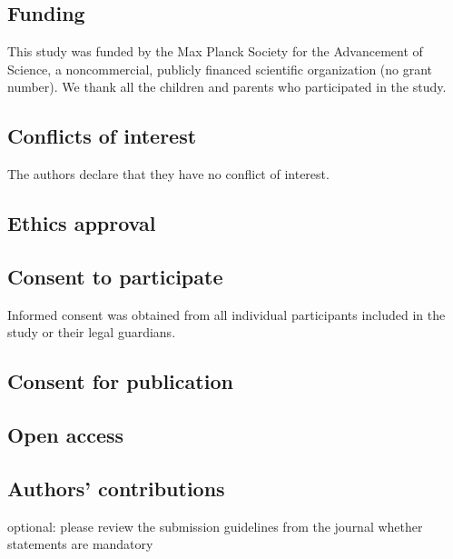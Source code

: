 \documentclass[
  english,
  man,floatsintext]{apa6}
\begin{document}
\hypertarget{funding}{%
\subsection{Funding}\label{funding}}

This study was funded by the Max Planck Society for the Advancement of Science, a noncommercial, publicly financed scientific organization (no grant number). We thank all the children and parents who participated in the study.

\hypertarget{conflicts-of-interest}{%
\subsection{Conflicts of interest}\label{conflicts-of-interest}}

The authors declare that they have no conflict of interest.

\hypertarget{ethics-approval}{%
\subsection{Ethics approval}\label{ethics-approval}}

\hypertarget{consent-to-participate}{%
\subsection{Consent to participate}\label{consent-to-participate}}

Informed consent was obtained from all individual participants included in the study or their legal guardians.

\hypertarget{consent-for-publication}{%
\subsection{Consent for publication}\label{consent-for-publication}}

\hypertarget{open-access}{%
\subsection{Open access}\label{open-access}}

\hypertarget{authors-contributions}{%
\subsection{Authors' contributions}\label{authors-contributions}}

optional: please review the submission guidelines from the journal whether statements are mandatory
\end{document}
